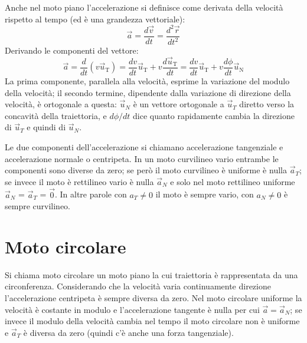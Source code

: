\documentclass[class=book, crop=false, oneside, 12pt]{standalone}
\begin{document}
Anche nel moto piano l'accelerazione si definisce come derivata della velocità rispetto al tempo (ed è una grandezza vettoriale): 
\begin{equation}
  \overrightarrow{a} = \frac{d \overrightarrow{v}}{dt} = \frac{d^2 \overrightarrow{r}}{dt^2}
\end{equation}
Derivando le componenti del vettore:
\begin{equation}
  \overrightarrow{a}=\frac{d}{d t}\left(v \overrightarrow{u}_{\mathrm{T}}\right)=\frac{d v}{d t} \overrightarrow{u}_{\mathrm{T}}+v \frac{d \overrightarrow{u}_{\mathrm{T}}}{d t}=\frac{d v}{d t} \overrightarrow{u}_{\mathrm{T}}+v \frac{d \phi}{d t} \overrightarrow{u}_{\mathrm{N}}
\end{equation}
La prima componente, parallela alla velocità, esprime la variazione del modulo della velocità; il secondo termine, dipendente dalla variazione di direzione della velocità, è ortogonale a questa:
\(\overrightarrow{u}_N\) è un vettore ortogonale a \(\overrightarrow{u}_T\) diretto verso la concavità della traiettoria, e \(d \phi/dt \) dice quanto rapidamente cambia la direzione di \(\overrightarrow{u}_T\)  e quindi di \(\overrightarrow{u}_N\). 

Le due componenti dell'accelerazione si chiamano accelerazione tangenziale e accelerazione normale o centripeta. 
In un moto curvilineo vario entrambe le componenti sono diverse da zero; se però il moto curvilineo è uniforme è nulla \(\overrightarrow{a}_T\); se invece il moto è rettilineo vario è nulla \(\overrightarrow{a}_N\) e solo nel moto rettilineo uniforme \(\overrightarrow{a}_N\) = \(\overrightarrow{a}_T\) = \(\overrightarrow{0}\).
In altre parole con \(a_T \neq 0\) il moto è sempre vario, con \(a_N \neq 0\) è  sempre curvilineo. 

\section{Moto circolare}

Si chiama moto circolare un moto piano la cui traiettoria è rappresentata da una circonferenza. Considerando che la velocità varia continuamente direzione l'accelerazione centripeta è sempre diversa da zero.
Nel moto circolare uniforme la velocità è costante in modulo e l'accelerazione tangente è nulla per cui \(\overrightarrow{a} = \overrightarrow{a}_N\);
se invece il modulo della velocità cambia nel tempo il moto circolare non è uniforme e \(\overrightarrow{a}_T\) è diversa da zero (quindi c'è anche una forza tangenziale).
\end{document}
